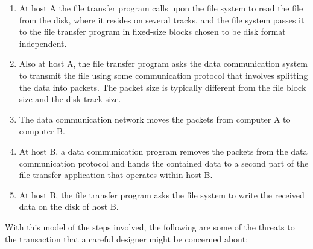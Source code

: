 \documentclass[a4paper,11pt,notitlepage,twoside,openright]{article}
\begin{document}
\begin{enumerate}[label=(\arabic*)]
\item

  At host A the file transfer program calls upon the file system to read
  the file from the disk, where it resides on several tracks, and the
  file system passes it to the file transfer program in fixed-size
  blocks chosen to be disk format independent.

\item

  Also at host A, the file transfer program asks the data communication
  system to transmit the file using some communication protocol that
  involves splitting the data into packets. The packet size is typically
  different from the file block size and the disk track size.

\item

  The data communication network moves the packets from computer A to
  computer B.

\item

  At host B, a data communication program removes the packets from the
  data communication protocol and hands the contained data to a second
  part of the file transfer application that operates within host B.

\item

  At host B, the file transfer program asks the file system to write the
  received data on the disk of host B.

\end{enumerate}

With this model of the steps involved, the following are some of the
threats to the transaction that a careful designer might be concerned
about:
\end{document}
